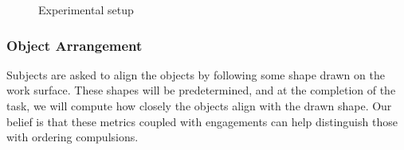 \documentclass[11pt]{article}
\begin{document}
\begin{figure}%
    \centering
    \qquad
    \caption{Experimental setup}%
    \label{setup}%
\end{figure}
\subsubsection{Object Arrangement}
Subjects are asked to align the objects by following some shape drawn on the work surface. These shapes will be predetermined, and at the completion of the task, we will compute how closely the objects align with the drawn shape. Our belief is that these metrics coupled with engagements can help distinguish those with ordering compulsions.
\end{document}
